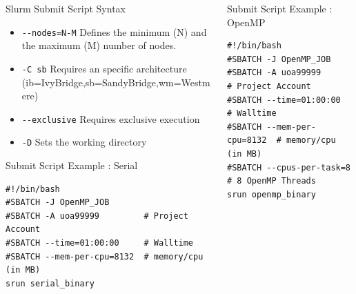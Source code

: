 \documentclass[final,t]{beamer}
\begin{document}
\begin{frame}[fragile]{}
\begin{columns}[t]
\begin{column}{.35\linewidth}
\begin{block}{Slurm Submit Script Syntax}
\begin{itemize}
        \item \verb|--nodes=N-M| Defines the minimum (N) and the maximum (M) number of nodes.
        \item \verb|-C sb| Requires an specific architecture (ib=IvyBridge,sb=SandyBridge,wm=Westmere)
        \item \verb|--exclusive| Requires exclusive execution
        \item \verb|-D| Sets the working directory
        \end{itemize}
      \end{block}


      \begin{block}{Submit Script Example : Serial}
              \vspace*{-3ex}
        \begin{verbatim}
#!/bin/bash
#SBATCH -J OpenMP_JOB
#SBATCH -A uoa99999         # Project Account
#SBATCH --time=01:00:00     # Walltime
#SBATCH --mem-per-cpu=8132  # memory/cpu (in MB)
srun serial_binary
        \end{verbatim}
                \vspace*{-4ex}
      \end{block}

    \end{column}

    
    \begin{column}{.3\linewidth}
    

      \begin{block}{Submit Script Example : OpenMP}
              \vspace*{-3ex}
        \begin{verbatim}
#!/bin/bash
#SBATCH -J OpenMP_JOB
#SBATCH -A uoa99999         # Project Account
#SBATCH --time=01:00:00     # Walltime
#SBATCH --mem-per-cpu=8132  # memory/cpu (in MB)
#SBATCH --cpus-per-task=8   # 8 OpenMP Threads
srun openmp_binary
        \end{verbatim}
                \vspace*{-4ex}
      \end{block}


\end{column}
\end{columns}
\end{frame}
\end{document}
